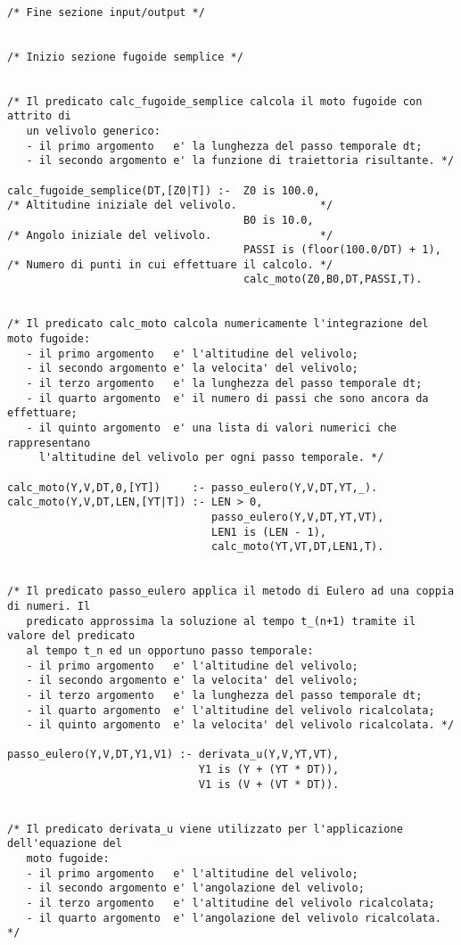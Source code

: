 \begin{verbatim}
      
/* Fine sezione input/output */


/* Inizio sezione fugoide semplice */


/* Il predicato calc_fugoide_semplice calcola il moto fugoide con attrito di 
   un velivolo generico:
   - il primo argomento   e' la lunghezza del passo temporale dt;
   - il secondo argomento e' la funzione di traiettoria risultante. */

calc_fugoide_semplice(DT,[Z0|T]) :-  Z0 is 100.0,                    /* Altitudine iniziale del velivolo.             */
                                     B0 is 10.0,                     /* Angolo iniziale del velivolo.                 */
                                     PASSI is (floor(100.0/DT) + 1), /* Numero di punti in cui effettuare il calcolo. */
                                     calc_moto(Z0,B0,DT,PASSI,T).


/* Il predicato calc_moto calcola numericamente l'integrazione del moto fugoide:
   - il primo argomento   e' l'altitudine del velivolo;
   - il secondo argomento e' la velocita' del velivolo;
   - il terzo argomento   e' la lunghezza del passo temporale dt;
   - il quarto argomento  e' il numero di passi che sono ancora da effettuare;
   - il quinto argomento  e' una lista di valori numerici che rappresentano 
     l'altitudine del velivolo per ogni passo temporale. */

calc_moto(Y,V,DT,0,[YT])     :- passo_eulero(Y,V,DT,YT,_).  
calc_moto(Y,V,DT,LEN,[YT|T]) :- LEN > 0,
                                passo_eulero(Y,V,DT,YT,VT),
                                LEN1 is (LEN - 1),
                                calc_moto(YT,VT,DT,LEN1,T).


/* Il predicato passo_eulero applica il metodo di Eulero ad una coppia di numeri. Il
   predicato approssima la soluzione al tempo t_(n+1) tramite il valore del predicato 
   al tempo t_n ed un opportuno passo temporale: 
   - il primo argomento   e' l'altitudine del velivolo;
   - il secondo argomento e' la velocita' del velivolo;
   - il terzo argomento   e' la lunghezza del passo temporale dt;
   - il quarto argomento  e' l'altitudine del velivolo ricalcolata;
   - il quinto argomento  e' la velocita' del velivolo ricalcolata. */

passo_eulero(Y,V,DT,Y1,V1) :- derivata_u(Y,V,YT,VT),
                              Y1 is (Y + (YT * DT)),
                              V1 is (V + (VT * DT)).


/* Il predicato derivata_u viene utilizzato per l'applicazione dell'equazione del 
   moto fugoide:
   - il primo argomento   e' l'altitudine del velivolo;
   - il secondo argomento e' l'angolazione del velivolo;
   - il terzo argomento   e' l'altitudine del velivolo ricalcolata;
   - il quarto argomento  e' l'angolazione del velivolo ricalcolata. */


\end{verbatim}
